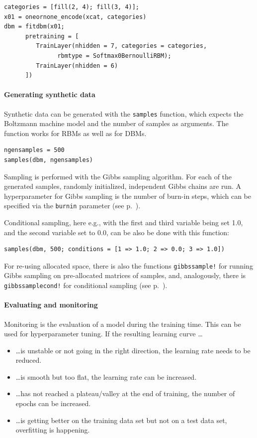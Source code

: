 \documentclass[12pt]{article}
\newcommand{\inlinecode}[1]{\texttt{#1}}
\begin{document}
\begin{lstlisting}
categories = [fill(2, 4); fill(3, 4)];
x01 = oneornone_encode(xcat, categories)
dbm = fitdbm(x01;
      pretraining = [
         TrainLayer(nhidden = 7, categories = categories,
               rbmtype = Softmax0BernoulliRBM);
         TrainLayer(nhidden = 6)
      ])
\end{lstlisting}

\paragraph{Generating synthetic data}\label{usagesampling}
Synthetic data can be generated with the \inlinecode{samples} function, which expects the Boltzmann machine model and the number of samples as arguments.
The function works for RBMs as well as for DBMs.

\begin{lstlisting}
ngensamples = 500
samples(dbm, ngensamples)
\end{lstlisting}

Sampling is performed with the Gibbs sampling algorithm.
For each of the generated samples, randomly initialized, independent Gibbs chains are run.
A hyperparameter for Gibbs sampling is the number of burn-in steps, which can be specified via the \inlinecode{burnin} parameter (see p.\ \pageref{bms_samples}).

Conditional sampling, here e.g., with the first and third variable being set 1.0, and the second variable set to 0.0, can be also be done with this function:

\begin{lstlisting}
samples(dbm, 500; conditions = [1 => 1.0; 2 => 0.0; 3 => 1.0])
\end{lstlisting}

For re-using allocated space, there is also the functions \inlinecode{gibbssample!} for running Gibbs sampling on pre-allocated matrices of samples, and, analogously, there is \inlinecode{gibbssamplecond!} for conditional sampling (see p.\ \pageref{bms_gibbssample!}).

\paragraph{Evaluating and monitoring}

Monitoring is the evaluation of a model during the training time.
This can be used for hyperparameter tuning.
If the resulting learning curve \dots
\begin{itemize}
\item \dots is unstable or not going in the right direction, the learning rate needs to be reduced.
\item \dots is smooth but too flat, the learning rate can be increased.
\item \dots has not reached a plateau/valley at the end of training, the number of epochs can be increased. 
\item \dots is getting better on the training data set but not on a test data set, overfitting is happening.
\end{itemize}
\end{document}
